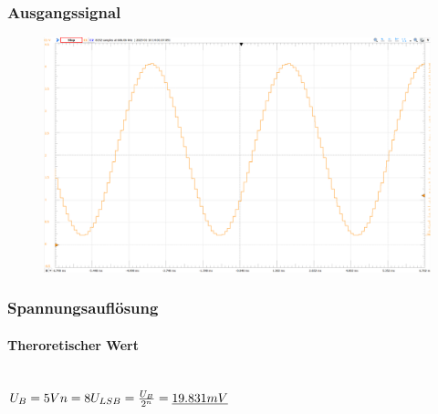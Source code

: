 \documentclass{article}
\begin{document}
\newpage
\subsubsection{Ausgangssignal}
\begin{figure}[h]
    \centering
    \includegraphics[width=1\linewidth]{img/Signal_01.png}
\end{figure}
\newpage
\subsubsection{Spannungsauflösung}
\paragraph{Theroretischer Wert}\mbox{}\\
\begin{math}
    U_B=5V\\
    n=8\\
    \\
    U_{LSB}=\frac{U_B}{2^n}=\underline{19.831mV}
\end{math}
\end{document}
